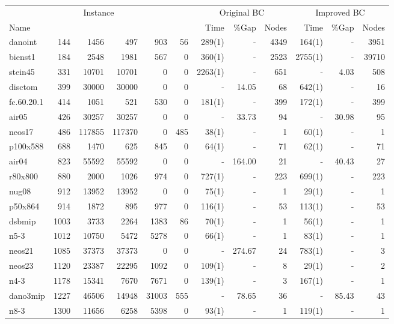 \begin{sidewaystable}[Hp]
\scriptsize
\begin{center}
\begin{tabular}{lrrrrr|rrr|rrr}
\hline
\multicolumn{6}{c|}{Instance} &
\multicolumn{3}{c|}{Original BC} &
\multicolumn{3}{c}{Improved BC} \\
Name &  &  &  &  &  & Time & \%Gap & Nodes & Time & \%Gap & Nodes	\\
\hline\hline
danoint	&	144	&	1456	&	497	&	903	&	56	&	289(1)	&	-	&	4349	&	164(1)	&	-	&	3951	\\
bienst1	&	184	&	2548	&	1981	&	567	&	0	&	360(1)	&	-	&	2523	&	2755(1)	&	-	&	39710	\\
stein45	&	331	&	10701	&	10701	&	0	&	0	&	2263(1)	&	-	&	651	&	-	&	4.03	&	508	\\
disctom	&	399	&	30000	&	30000	&	0	&	0	&	-	&	14.05	&	68	&	642(1)	&	-	&	16	\\
fc.60.20.1	&	414	&	1051	&	521	&	530	&	0	&	181(1)	&	-	&	399	&	172(1)	&	-	&	399	\\
air05	&	426	&	30257	&	30257	&	0	&	0	&	-	&	33.73	&	94	&	-	&	30.98	&	95	\\
neos17	&	486	&	117855	&	117370	&	0	&	485	&	38(1)	&	-	&	1	&	60(1)	&	-	&	1	\\
p100x588	&	688	&	1470	&	625	&	845	&	0	&	64(1)	&	-	&	71	&	62(1)	&	-	&	71	\\
air04	&	823	&	55592	&	55592	&	0	&	0	&	-	&	164.00	&	21	&	-	&	40.43	&	27	\\
r80x800	&	880	&	2000	&	1026	&	974	&	0	&	727(1)	&	-	&	223	&	699(1)	&	-	&	223	\\
nug08	&	912	&	13952	&	13952	&	0	&	0	&	75(1)	&	-	&	1	&	29(1)	&	-	&	1	\\
p50x864	&	914	&	1872	&	895	&	977	&	0	&	116(1)	&	-	&	53	&	113(1)	&	-	&	53	\\
dsbmip	&	1003	&	3733	&	2264	&	1383	&	86	&	70(1)	&	-	&	1	&	56(1)	&	-	&	1	\\
n5-3	&	1012	&	10750	&	5472	&	5278	&	0	&	66(1)	&	-	&	1	&	83(1)	&	-	&	1	\\
neos21	&	1085	&	37373	&	37373	&	0	&	0	&	-	&	274.67	&	24	&	783(1)	&	-	&	3	\\
neos23	&	1120	&	23387	&	22295	&	1092	&	0	&	109(1)	&	-	&	8	&	29(1)	&	-	&	2	\\
n4-3	&	1178	&	15341	&	7670	&	7671	&	0	&	139(1)	&	-	&	3	&	167(1)	&	-	&	1	\\
dano3mip	&	1227	&	46506	&	14948	&	31003	&	555	&	-	&	78.65	&	36	&	-	&	85.43	&	43	\\
n8-3	&	1300	&	11656	&	6258	&	5398	&	0	&	93(1)	&	-	&	1	&	119(1)	&	-	&	1	\\

\end{tabular}
\end{center}
\end{sidewaystable}
